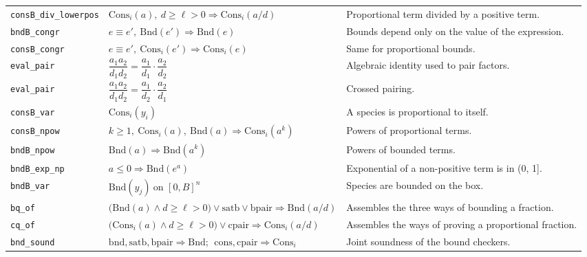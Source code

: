 {\begin{longtable}{@{}>{\raggedright\arraybackslash}p{3.6cm}>{\raggedright\arraybackslash}p{6.6cm}>{\raggedright\arraybackslash}p{5.6cm}@{}}
\texttt{consB\_\allowbreak{}div\_\allowbreak{}lowerpos} & $\displaystyle \mathrm{Cons}_i(a),\ d\ge\ell>0\Rightarrow\mathrm{Cons}_i(a/d)$ & Proportional term divided by a positive term. \\[3pt]
\texttt{bndB\_\allowbreak{}congr} & $\displaystyle e\equiv e',\ \mathrm{Bnd}(e')\Rightarrow\mathrm{Bnd}(e)$ & Bounds depend only on the value of the expression. \\[3pt]
\texttt{consB\_\allowbreak{}congr} & $\displaystyle e\equiv e',\ \mathrm{Cons}_i(e')\Rightarrow\mathrm{Cons}_i(e)$ & Same for proportional bounds. \\[3pt]
\texttt{eval\_\allowbreak{}pair} & $\displaystyle \dfrac{a_1a_2}{d_1d_2}=\dfrac{a_1}{d_1}\cdot\dfrac{a_2}{d_2}$ & Algebraic identity used to pair factors. \\[3pt]
\texttt{eval\_\allowbreak{}pair\textquotesingle{}} & $\displaystyle \dfrac{a_1a_2}{d_1d_2}=\dfrac{a_1}{d_2}\cdot\dfrac{a_2}{d_1}$ & Crossed pairing. \\[3pt]
\texttt{consB\_\allowbreak{}var} & $\displaystyle \mathrm{Cons}_i(y_i)$ & A species is proportional to itself. \\[3pt]
\texttt{consB\_\allowbreak{}npow} & $\displaystyle k\ge1,\ \mathrm{Cons}_i(a),\ \mathrm{Bnd}(a)\Rightarrow\mathrm{Cons}_i(a^k)$ & Powers of proportional terms. \\[3pt]
\texttt{bndB\_\allowbreak{}npow} & $\displaystyle \mathrm{Bnd}(a)\Rightarrow\mathrm{Bnd}(a^k)$ & Powers of bounded terms. \\[3pt]
\texttt{bndB\_\allowbreak{}exp\_\allowbreak{}np} & $\displaystyle a\le0\Rightarrow\mathrm{Bnd}(e^a)$ & Exponential of a non-positive term is in (0, 1]. \\[3pt]
\texttt{bndB\_\allowbreak{}var} & $\displaystyle \mathrm{Bnd}(y_j)\ \text{on }[0,B]^n$ & Species are bounded on the box. \\[3pt]
\texttt{bq\_\allowbreak{}of} & $\displaystyle \bigl(\mathrm{Bnd}(a)\wedge d\ge\ell>0\bigr)\lor\mathrm{satb}\lor\mathrm{bpair}\Rightarrow\mathrm{Bnd}(a/d)$ & Assembles the three ways of bounding a fraction. \\[3pt]
\texttt{cq\_\allowbreak{}of} & $\displaystyle \bigl(\mathrm{Cons}_i(a)\wedge d\ge\ell>0\bigr)\lor\mathrm{cpair}\Rightarrow\mathrm{Cons}_i(a/d)$ & Assembles the ways of proving a proportional fraction. \\[3pt]
\texttt{bnd\_\allowbreak{}sound} & $\displaystyle \mathrm{bnd},\mathrm{satb},\mathrm{bpair}\Rightarrow\mathrm{Bnd};\ \ \mathrm{cons},\mathrm{cpair}\Rightarrow\mathrm{Cons}_i$ & Joint soundness of the bound checkers. \\[3pt]

\end{longtable}}
